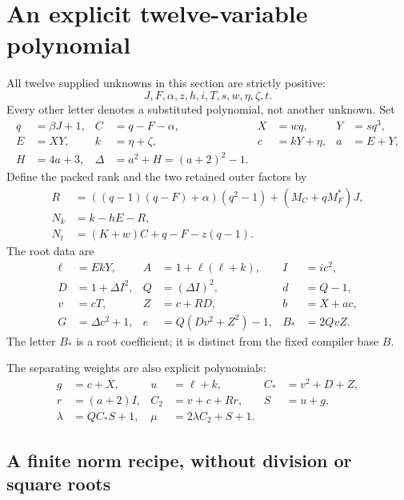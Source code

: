 \section{An explicit twelve-variable polynomial}
\label{sec:primitive}

All twelve supplied unknowns in this section are strictly positive:
\[
\boxed{J,F,\alpha,z,h,i,T,s,w,\eta,\zeta,t.}
\]
Every other letter denotes a substituted polynomial, not another
unknown.  Set
\begin{align*}
q&=\beta J+1,& C&=q-F-\alpha,& X&=wq,&Y&=sq^3,\\
E&=XY,&k&=\eta+\zeta,&c&=kY+\eta,&a&=E+Y,\\
H&=4a+3,&\Delta&=a^2+H=(a+2)^2-1.
\end{align*}
Define the packed rank and the two retained outer factors by
\begin{align}
R&=((q-1)(q-F)+\alpha)(q^2-1)+(M_C+qM_F^*)J,\label{eq:rank}\\
N_k&=k-hE-R,\label{eq:index}\\
N_t&=(K+w)C+q-F-z(q-1).\label{eq:transport}
\end{align}
The root data are
\begin{align*}
\ell&=EkY,& A&=1+\ell(\ell+k),& I&=ic^2,\\
D&=1+\Delta I^2,&Q&=(\Delta I)^2,&d&=Q-1,\\
v&=cT,&Z&=c+RD,&b&=X+ac,\\
G&=\Delta c^2+1,& e&=Q(Dv^2+Z^2)-1,&B_*&=2QvZ.
\end{align*}
The letter $B_*$ is a root coefficient; it is distinct from the fixed
compiler base $B$.

The separating weights are also explicit polynomials:
\begin{align}
g&=c+X,&u&=\ell+k,&C_*&=v^2+D+Z,\nonumber\\
r&=(a+2)I,&C_2&=v+c+Rr,&S&=u+g,\label{eq:weights}\\
\lambda&=QC_*S+1,&\mu&=2\lambda C_2+S+1.\nonumber
\end{align}

\subsection{A finite norm recipe, without division or square roots}


